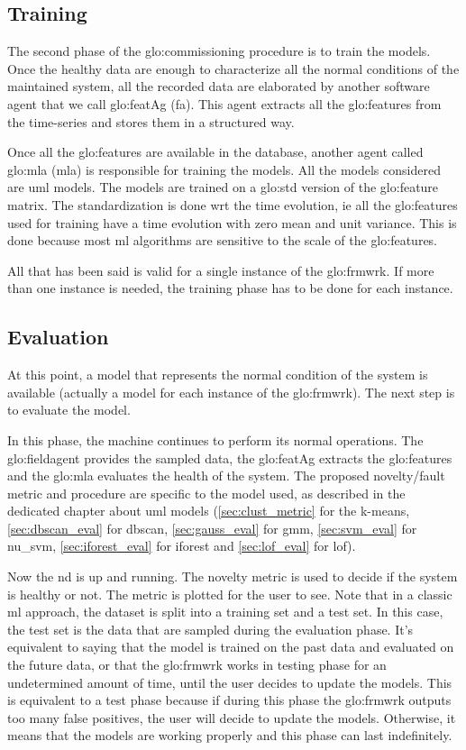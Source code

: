 \subsection{Training}
The second phase of the \gls{glo:commissioning} procedure is to train the models. Once the healthy data are enough to characterize all the normal conditions of the maintained system, all the recorded data are elaborated by another software agent that we call \gls{glo:featAg} (\gls{fa}). This agent extracts all the \gls{glo:feature}s from the time-series and stores them in a structured way.

Once all the \gls{glo:feature}s are available in the database, another agent called \gls{glo:mla} (\gls{mla}) is responsible for training the models. All the models considered are \gls{uml} models. The models are trained on a \gls{glo:std} version of the \gls{glo:feature} matrix. The standardization is done \gls{wrt} the time evolution, \gls{ie} all the \gls{glo:feature}s used for training have a time evolution with zero mean and unit variance. This is done because most \gls{ml} algorithms are sensitive to the scale of the \gls{glo:feature}s.

All that has been said is valid for a single instance of the \gls{glo:frmwrk}. If more than one instance is needed, the training phase has to be done for each instance.

\subsection{Evaluation}
At this point, a model that represents the normal condition of the system is available (actually a model for each instance of the \gls{glo:frmwrk}). The next step is to evaluate the model.

In this phase, the machine continues to perform its normal operations. The \gls{glo:fieldagent} provides the sampled data, the \gls{glo:featAg} extracts the \gls{glo:feature}s and the \gls{glo:mla} evaluates the health of the system.
The proposed novelty/fault metric and procedure are specific to the model used, as described in the dedicated chapter about \gls{uml} models (\autoref{sec:clust_metric} for the k-means, \autoref{sec:dbscan_eval} for \gls{dbscan}, \autoref{sec:gauss_eval} for \gls{gmm}, \autoref{sec:svm_eval} for \gls{nu_svm}, \autoref{sec:iforest_eval} for \gls{iforest} and \autoref{sec:lof_eval} for \gls{lof}). 

Now the \gls{nd} is up and running. The novelty metric is used to decide if the system is healthy or not. The metric is plotted for the user to see.
Note that in a classic \gls{ml} approach, the dataset is split into a training set and a test set. In this case, the test set is the data that are sampled during the evaluation phase. It's equivalent to saying that the model is trained on the past data and evaluated on the future data, or that the \gls{glo:frmwrk} works in testing phase for an undetermined amount of time, until the user decides to update the models. This is equivalent to a test phase because if during this phase the \gls{glo:frmwrk} outputs too many false positives, the user will decide to update the models. Otherwise, it means that the models are working properly and this phase can last indefinitely.

